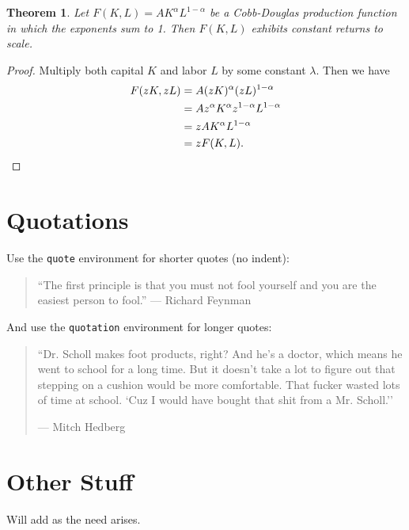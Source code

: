 \documentclass[12pt]{article}
\newtheorem{theorem}{Theorem}
\begin{document}
\begin{theorem}Let $F(K,L)=AK^{\alpha}L^{1 - \alpha}$ be a Cobb-Douglas
production function in which the exponents sum to 1. Then $F(K,L)$ exhibits constant returns to scale.
\end{theorem}
\begin{proof}
Multiply both capital $K$ and labor $L$ by some constant $\lambda$. Then we have
\begin{align*}
		F(zK, zL) 	&=	A(zK)^{\alpha}(zL)^{1 - \alpha}	\\
				&=	Az^{\alpha}K^{\alpha}z^{1-\alpha}L^{1 - \alpha}	\\
				&=	zAK^{\alpha}L^{1 - \alpha}	\\
				&=	zF(K, L). 	\qedhere
	\end{align*}
\end{proof}



\section{Quotations}

Use the \verb|quote| environment for shorter quotes (no indent):
\begin{quote}
``The first principle is that you must not fool yourself and you are the easiest
person to fool.'' --- Richard Feynman
\end{quote}
And use the \verb|quotation| environment for longer quotes:
\begin{quotation}
``Dr. Scholl makes foot products, right? And he's a doctor, which means he went
to school for a long time. But it doesn't take a lot to figure out that stepping
on a cushion would be more comfortable. That fucker wasted lots of time at
school. `Cuz I would have bought that shit from a Mr. Scholl.''
	
	\hfill --- Mitch Hedberg
\end{quotation}

	
	
\section{Other Stuff}
	
Will add as the need arises. 
 
	
\end{document}
